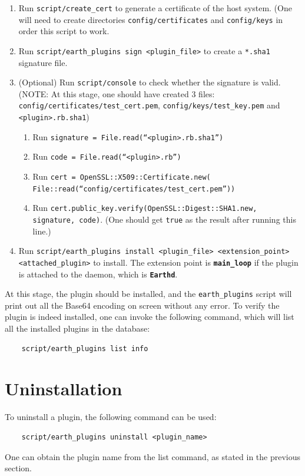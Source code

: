 \documentclass{article}
\begin{document}
\begin{enumerate}
    \item Run \texttt{script/create\_cert} to generate a certificate of the host system. (One will need to create directories \texttt{config/certificates} and \texttt{config/keys} in order this script to work. 
    \item Run \texttt{script/earth\_plugins sign <plugin\_file>} to create a \texttt{*.sha1} signature file. 
    \item (Optional) Run \texttt{script/console} to check whether the signature is valid. (NOTE: At this stage, one should have created 3 files: \texttt{config/certificates/test\_cert.pem}, \texttt{config/keys/test\_key.pem} and \texttt{<plugin>.rb.sha1})
        \begin{enumerate}
            \item Run \texttt{signature = File.read(``<plugin>.rb.sha1'')}
            \item Run \texttt{code = File.read(``<plugin>.rb'')}
            \item Run \texttt{cert = OpenSSL::X509::Certificate.new( \\ File::read(``config/certificates/test\_cert.pem''))}
            \item Run \texttt{cert.public\_key.verify(OpenSSL::Digest::SHA1.new, signature, code)}. (One should get \texttt{true} as the result after running this line.)
        \end{enumerate}
    \item Run \texttt{script/earth\_plugins install <plugin\_file> <extension\_point> <attached\_plugin>} to install. The extension point is \textbf{\texttt{main\_loop}} if the plugin is attached to the daemon, which is \textbf{\texttt{Earthd}}. 
\end{enumerate}

At this stage, the plugin should be installed, and the \texttt{earth\_plugins} script will print out all the Base64 encoding on screen without any error. To verify the plugin is indeed installed, one can invoke the following command, which will list all the installed plugins in the database:

\begin{verbatim}
    script/earth_plugins list info
\end{verbatim}


\section{Uninstallation} %
\label{sec:uninstallation}

To uninstall a plugin, the following command can be used:

\begin{verbatim}
    script/earth_plugins uninstall <plugin_name>
\end{verbatim}

One can obtain the plugin name from the list command, as stated in the previous section.

\end{document}

